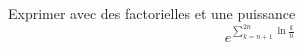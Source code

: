 Exprimer avec des factorielles et une puissance 
\begin{displaymath}
 e^{\sum_{k=n+1}^{2n}\ln\frac{k}{n}}
\end{displaymath}
\bigskip

